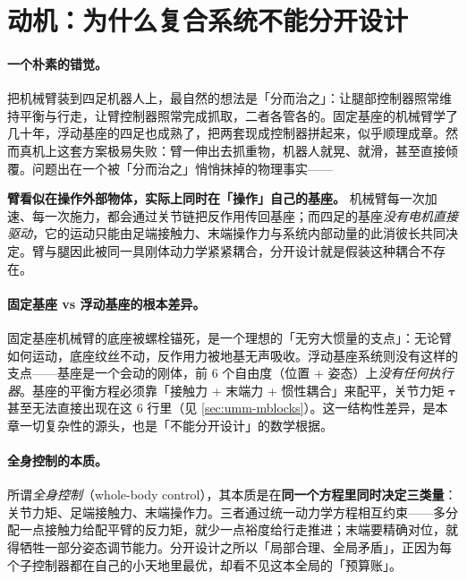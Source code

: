 \section{动机：为什么复合系统不能分开设计}
\label{sec:umm-motivation}

\paragraph{一个朴素的错觉。}
把机械臂装到四足机器人上，最自然的想法是「分而治之」：让腿部控制器照常维持平衡与行走，让臂控制器照常完成抓取，二者各管各的。固定基座的机械臂学了几十年，浮动基座的四足也成熟了，把两套现成控制器拼起来，似乎顺理成章。然而真机上这套方案极易失败：臂一伸出去抓重物，机器人就晃、就滑，甚至直接倾覆。问题出在一个被「分而治之」悄悄抹掉的物理事实——

\begin{insight}
\textbf{臂看似在操作外部物体，实际上同时在「操作」自己的基座。}\;
机械臂每一次加速、每一次施力，都会通过关节链把反作用传回基座；而四足的基座\emph{没有电机直接驱动}，它的运动只能由足端接触力、末端操作力与系统内部动量的此消彼长共同决定。臂与腿因此被同一具刚体动力学紧紧耦合，分开设计就是假装这种耦合不存在。
\end{insight}

\paragraph{固定基座 vs 浮动基座的根本差异。}
固定基座机械臂的底座被螺栓锚死，是一个理想的「无穷大惯量的支点」：无论臂如何运动，底座纹丝不动，反作用力被地基无声吸收。浮动基座系统则没有这样的支点——基座是一个会动的刚体，前 6 个自由度（位置 + 姿态）上\emph{没有任何执行器}。基座的平衡方程必须靠「接触力 + 末端力 + 惯性耦合」来配平，关节力矩 $\boldsymbol\tau$ 甚至无法直接出现在这 6 行里（见 \cref{sec:umm-mblocks}）。这一结构性差异，是本章一切复杂性的源头，也是「不能分开设计」的数学根据。

\paragraph{全身控制的本质。}
所谓\emph{全身控制}（whole-body control），其本质是在\textbf{同一个方程里同时决定三类量}：关节力矩、足端接触力、末端操作力。三者通过统一动力学方程相互约束——多分配一点接触力给配平臂的反力矩，就少一点裕度给行走推进；末端要精确对位，就得牺牲一部分姿态调节能力。分开设计之所以「局部合理、全局矛盾」，正因为每个子控制器都在自己的小天地里最优，却看不见这本全局的「预算账」。

